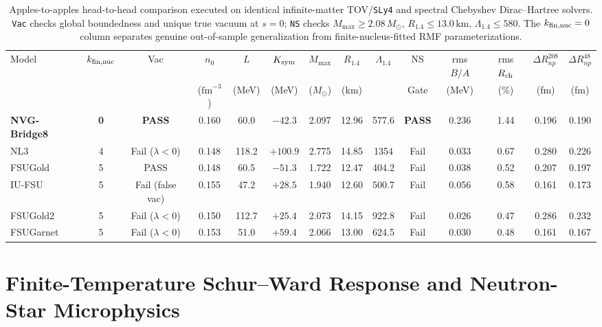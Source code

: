 \documentclass[aps,prc,twocolumn,superscriptaddress,nofootinbib,floatfix]{revtex4-2}
\begin{document}
\begin{table}[t]
\caption{Apples-to-apples head-to-head comparison executed on identical infinite-matter TOV/\texttt{SLy4} and spectral Chebyshev Dirac--Hartree solvers. \texttt{Vac} checks global boundedness and unique true vacuum at $s=0$; \texttt{NS} checks $M_{\max} \ge 2.08\,M_\odot$, $R_{1.4} \le 13.0\,\mathrm{km}$, $\Lambda_{1.4} \le 580$. The $k_{\rm fin,nuc}=0$ column separates genuine out-of-sample generalization from finite-nucleus-fitted RMF parameterizations.}
\label{tab:scorecard}
\begin{ruledtabular}
\begin{tabular}{lccccccccccccc}
Model & $k_{\rm fin,nuc}$ & Vac & $n_0$ & $L$ & $K_{\rm sym}$ & $M_{\max}$ & $R_{1.4}$ & $\Lambda_{1.4}$ & NS & rms $B/A$ & rms $R_{\rm ch}$ & $\Delta R_{np}^{208}$ & $\Delta R_{np}^{48}$ \\
 & & & ($\mathrm{fm}^{-3}$) & (MeV) & (MeV) & ($M_\odot$) & (km) & & Gate & (MeV) & (\%) & (fm) & (fm) \\
\hline
\textbf{NVG-Bridge8} & \textbf{0} & \textbf{PASS} & 0.160 & 60.0 & $-42.3$ & 2.097 & 12.96 & 577.6 & \textbf{PASS} & 0.236 & 1.44 & 0.196 & 0.190 \\
NL3 & 4 & Fail ($\lambda<0$) & 0.148 & 118.2 & $+100.9$ & 2.775 & 14.85 & 1354 & Fail & 0.033 & 0.67 & 0.280 & 0.226 \\
FSUGold & 5 & PASS & 0.148 & 60.5 & $-51.3$ & 1.722 & 12.47 & 404.2 & Fail & 0.038 & 0.52 & 0.207 & 0.197 \\
IU-FSU & 5 & Fail (false vac) & 0.155 & 47.2 & $+28.5$ & 1.940 & 12.60 & 500.7 & Fail & 0.056 & 0.58 & 0.161 & 0.173 \\
FSUGold2 & 5 & Fail ($\lambda<0$) & 0.150 & 112.7 & $+25.4$ & 2.073 & 14.15 & 922.8 & Fail & 0.026 & 0.47 & 0.286 & 0.232 \\
FSUGarnet & 5 & Fail ($\lambda<0$) & 0.153 & 51.0 & $+59.4$ & 2.066 & 13.00 & 624.5 & Fail & 0.030 & 0.48 & 0.161 & 0.167 \\
\end{tabular}
\end{ruledtabular}
\end{table}

\section{Finite-Temperature Schur--Ward Response and Neutron-Star Microphysics}\label{sec:astro}
\end{document}
